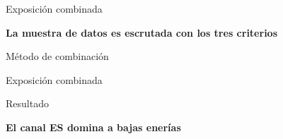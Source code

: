 \begin{frame}{Exposici\'on combinada}
	\begin{alertblock}{}
		\begin{center}
			\textbf{La muestra de datos es escrutada con los tres criterios}
		\end{center}
	\end{alertblock}
	\begin{block}{M\'etodo de combinaci\'on}
		\begin{center}
		\end{center}
	\end{block}
\end{frame}

\begin{frame}{Exposici\'on combinada}
	\begin{block}{Resultado}
		\begin{center}
		\end{center}
	\end{block}
	\begin{alertblock}{}
		\begin{center}
			\textbf{El canal ES domina a bajas ener\'ias}
		\end{center}
	\end{alertblock}
\end{frame}
% 

